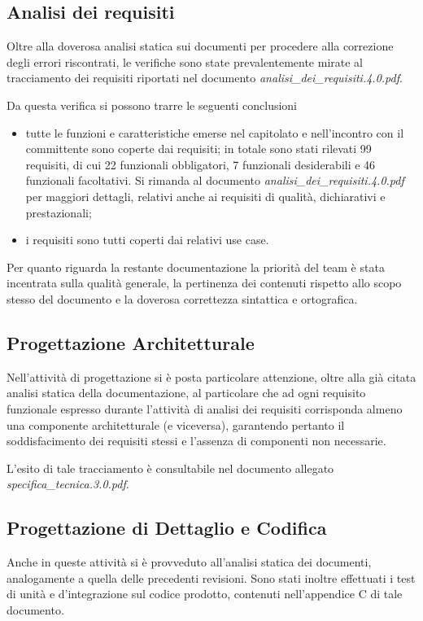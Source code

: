 \subsection{Analisi dei requisiti}
Oltre alla doverosa analisi statica sui documenti per procedere alla correzione degli errori riscontrati, le verifiche sono state prevalentemente mirate al tracciamento dei requisiti riportati nel documento \textit{analisi\_dei\_requisiti.4.0.pdf}.

Da questa verifica si possono trarre le seguenti conclusioni
\begin{itemize}
\item tutte le funzioni e caratteristiche emerse nel capitolato e nell'incontro con il committente sono coperte dai requisiti;
in totale sono stati rilevati 99 requisiti, di cui 22 funzionali obbligatori, 7 funzionali desiderabili e 46 funzionali facoltativi. Si rimanda al documento \textit{analisi\_dei\_requisiti.4.0.pdf} per maggiori dettagli, relativi anche ai requisiti di qualità, dichiarativi e prestazionali;

\item i requisiti sono tutti coperti dai relativi use case.
\end{itemize}

Per quanto riguarda la restante documentazione la priorità del team è stata incentrata sulla qualità generale, la pertinenza dei contenuti rispetto allo scopo stesso del documento e la doverosa correttezza sintattica e ortografica.

\subsection {Progettazione Architetturale}
Nell'attività di progettazione si è posta particolare attenzione, oltre alla già citata analisi statica della documentazione, al particolare che ad ogni requisito funzionale espresso durante l'attività di analisi dei requisiti corrisponda almeno una componente architetturale (e viceversa), garantendo pertanto il soddisfacimento dei requisiti stessi e l'assenza di componenti non necessarie.

L'esito di tale tracciamento è consultabile nel documento allegato \textit{specifica\_tecnica.3.0.pdf}.

\subsection {Progettazione di Dettaglio e Codifica}
Anche in queste attività si è provveduto all'analisi statica dei documenti, analogamente a quella delle precedenti revisioni.
Sono stati inoltre effettuati i test di unità e d'integrazione sul codice prodotto, contenuti nell'appendice C di tale documento.

